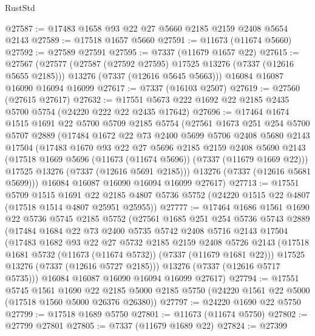 \begin{lexlean}{RustStd}
\begin{coremodule}
@27587 := @17483 @1658 @93 @22 @27 @5660 @2185 @2159 @2408 @5654 @2143
@27589 := @17518 @1657 @5660
@27591 := @11673 (@11674 @5660)
@27592 := @27589 @27591
@27595 := @7337 (@11679 @1657 @22)
@27615 := @27567
    (@27577
      (@27587 (@27592 @27595) @17525 @13276 (@7337 (@12616 @5655 @2185)))
      @13276
      (@7337 (@12616 @5645 @5663)))
    @16084
    @16087
    @16090
    @16094
    @16099
@27617 := @7337 (@16103 @2507)
@27619 := @27560 (@27615 @27617)
@27632 := @17551 @5673 @222 @1692 @22 @2185 @2435 @5700 @5754 (@24220 @222 @22 @2435 @17642)
@27696 := @17464
    @1674
    @1515
    @1691
    @22
    @5700
    @5709
    @2185
    @5754
    (@27561
      @1673
      @251
      @254
      @5700
      @5707
      @2889
      (@17484
        @1672
        @22
        @73
        @2400
        @5699
        @5706
        @2408
        @5680
        @2143
        @17504
        (@17483
          @1670
          @93
          @22
          @27
          @5696
          @2185
          @2159
          @2408
          @5690
          @2143
          (@17518 @1669 @5696 (@11673 (@11674 @5696)) (@7337 (@11679 @1669 @22)))
          @17525
          @13276
          (@7337 (@12616 @5691 @2185)))
        @13276
        (@7337 (@12616 @5681 @5699)))
      @16084
      @16087
      @16090
      @16094
      @16099
      @27617)
@27713 := @17551
    @5709
    @1515
    @1691
    @22
    @2185
    @4807
    @5736
    @5752
    (@24220 @1515 @22 @4807 (@17518 @1514 @4807 @25951 @25955))
@27777 := @17464
    @1686
    @1561
    @1690
    @22
    @5736
    @5745
    @2185
    @5752
    (@27561
      @1685
      @251
      @254
      @5736
      @5743
      @2889
      (@17484
        @1684
        @22
        @73
        @2400
        @5735
        @5742
        @2408
        @5716
        @2143
        @17504
        (@17483
          @1682
          @93
          @22
          @27
          @5732
          @2185
          @2159
          @2408
          @5726
          @2143
          (@17518 @1681 @5732 (@11673 (@11674 @5732)) (@7337 (@11679 @1681 @22)))
          @17525
          @13276
          (@7337 (@12616 @5727 @2185)))
        @13276
        (@7337 (@12616 @5717 @5735)))
      @16084
      @16087
      @16090
      @16094
      @16099
      @27617)
@27794 := @17551
    @5745
    @1561
    @1690
    @22
    @2185
    @5000
    @2185
    @5750
    (@24220 @1561 @22 @5000 (@17518 @1560 @5000 @26376 @26380))
@27797 := @24220 @1690 @22 @5750
@27799 := @17518 @1689 @5750
@27801 := @11673 (@11674 @5750)
@27802 := @27799 @27801
@27805 := @7337 (@11679 @1689 @22)
@27824 := @27399

\end{coremodule}
\end{lexlean}
